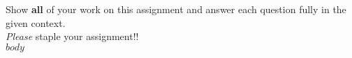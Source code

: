 \documentclass[11pt]{article}
\begin{document}
\pagestyle{fancy} 

Show \textbf{all} of your work on this assignment and answer each question fully in the given context. \\

\emph{Please} staple your assignment!! \\

$body$
\end{document}
